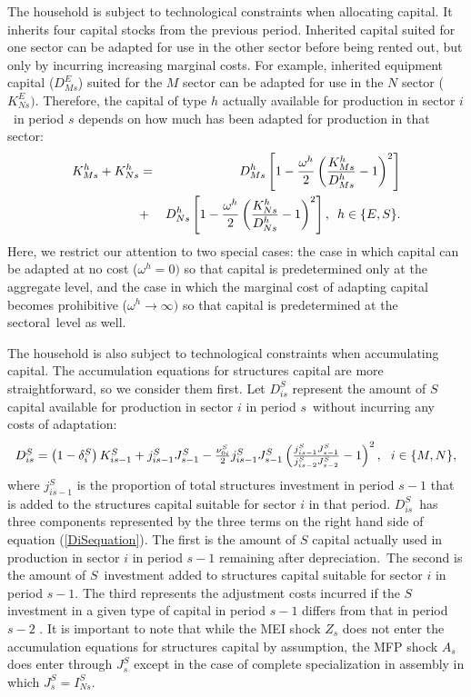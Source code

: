 \documentclass[12pt,fleqn]{article}
\begin{document}
{\normalsize The household is subject to technological constraints when
allocating capital. It inherits four capital stocks from the previous
period. Inherited capital suited for one sector can be adapted for use in
the other sector before being rented out, but only by incurring increasing
marginal costs. For example, inherited equipment capital ($D_{Ms}^{E}$)
suited for the $M$ sector can be adapted for use in the $N$ sector ($%
K_{Ns}^{E})$. Therefore, the capital of type $h$ actually available for
production in sector $i$\ in period $s$ depends on how much has been adapted
for production in that sector:%
\begin{eqnarray}
K_{Ms}^{h}+K_{Ns}^{h}&=&D_{Ms}^{h}\left[ 1-\frac{\omega ^{h}}{2}\left( \frac{%
K_{Ms}^{h}}{D_{Ms}^{h}}-1\right) ^{2}\right]  \notag \\
&+& D_{Ns}^{h}\left[ 1-\frac{\omega ^{h}}{2}\left( \frac{K_{Ns}^{h}}{%
D_{Ns}^{h}}-1\right) ^{2}\right] , \,\,\, h \in \{E,S\}.
\end{eqnarray}%
Here, we restrict our attention to two special cases: the case in which
capital can be adapted at no cost ($\omega ^{h}=0)$ so that capital is
predetermined only at the aggregate level, and the case in which the
marginal cost of adapting capital becomes prohibitive ($\omega
^{h}\rightarrow \infty )$ so that capital is predetermined at the sectoral\
level as well. }

{\normalsize The household is also subject to technological constraints when
accumulating capital. The accumulation equations for structures capital are
more straightforward, so we consider them first. Let $D_{is}^{S}$ represent
the amount of $S$ capital available for production in sector $i$ in period $%
s $\ without incurring any costs of adaptation:
\begin{equation}
\begin{tabular}{c}
$D_{is}^{S}=\left( 1-\delta_i^{S}\right) K_{is-1}^{S}+j_{is-1}^{S}J_{s-1}^{S}-%
\frac{\nu_{0i}^{S}}{2}j_{is-1}^{S}J_{s-1}^{S}\left( \frac{%
j_{is-1}^{S}J_{s-1}^{S}}{j_{is-2}^{S}J_{s-2}^{S}}-1\right) ^{2},\,\,\,\,i\in
\{M,N\},$%
\end{tabular}
\label{DiSequation}
\end{equation}%
where $j_{is-1}^{S}$ is the proportion of total structures investment in
period $s-1$ that is added to the structures capital suitable for sector $i$
in that period. $D_{is}^{S}$\ has three components represented by the three
terms on the right hand side of equation (\ref{DiSequation}). The first is the
amount of $S$ capital actually used in production in sector $i$ in period $%
s-1$ remaining after depreciation.\ The second is the amount of $S$\
investment added to structures capital suitable for sector $i$ in period $s-1
$. The third represents the adjustment costs incurred if the $S$ investment
in a given type of capital in period $s-1$ differs from that in period $s-2$%
. It is important to note that while the MEI shock $Z_s$ does not enter the
accumulation equations for structures capital by assumption, the MFP shock $%
A_s$ does enter through $J_{s}^{S}$ except in the case of complete
specialization in assembly in which $J_{s}^{S}=I_{Ns}^{S}$. }
\end{document}
